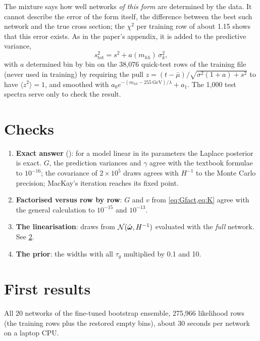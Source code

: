 The mixture says how well networks \emph{of this form} are determined by the data. It
cannot describe the error of the form itself, the difference between the best such network
and the true cross section; the $\chi^2$ per training row of about 1.15 shows that this error
exists. As in the paper's appendix, it is added to the predictive variance,
\begin{equation}
  s_\text{tot}^2 = s^2 + a(m_{hh})\, \sigma_k^2 ,
\end{equation}
with $a$ determined bin by bin on the 38,076 quick-test rows of the training file (never
used in training) by requiring the pull $z = (t - \bar\mu)/\sqrt{\sigma^2(1 + a) + s^2}$ to
have $\langle z^2\rangle = 1$, and smoothed with
$a_0 e^{-(m_{hh} - 255\,\text{GeV})/\lambda} + a_1$. The 1,000 test spectra serve only to
check the result.

\section{Checks}

\begin{enumerate}
  \item \textbf{Exact answer} (): for a model linear in its
    parameters the Laplace posterior is exact. $G$, the prediction variances and
    $\gamma$ agree with the textbook formulae to $10^{-16}$; the covariance of $2\times10^5$
    draws agrees with $H^{-1}$ to the Monte Carlo precision; MacKay's iteration reaches its
    fixed point.
  \item \textbf{Factorised versus row by row}: $G$ and $v$ from \cref{eq:Gfact,eq:K} agree
    with the general calculation to $10^{-15}$ and $10^{-13}$.
  \item \textbf{The linearisation}: draws from $\mathcal{N}(\hat{\boldsymbol{\omega}}, H^{-1})$ evaluated with
    the \emph{full} network. See \cref{sec:results}.
  \item \textbf{The prior}: the widths with all $\tau_g$ multiplied by 0.1 and 10.
\end{enumerate}

\section{First results}
\label{sec:results}

All 20 networks of the fine-tuned bootstrap ensemble, 275,966 likelihood rows (the
training rows plus the restored empty bins), about 30 seconds per network on a laptop CPU.

